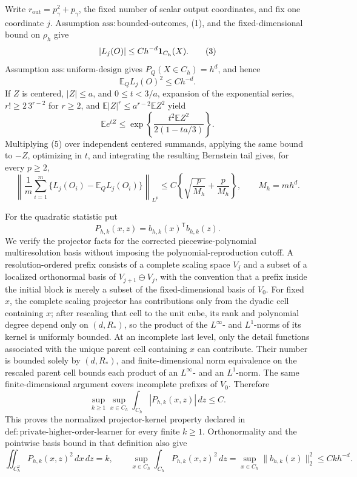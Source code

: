 Write \(r_{\mathrm{out}}=p_\gamma^2+p_\gamma\), the fixed number of scalar output coordinates, and fix one coordinate \(j\).  Assumption \(\mathrm{ass{:}bounded\text{-}outcomes}\), (1), and the fixed-dimensional bound on \(\rho_h\) give
\[
 |L_j(O)|\leq C h^{-d}{\bf1}_{C_h}(X).
\tag{3}
\]
Assumption \(\mathrm{ass{:}uniform\text{-}design}\) gives \(P_Q(X\in C_h)=h^d\), and hence
\[
 \mathbb E_Q L_j(O)^2\leq C h^{-d}.
\tag{4}
\]
If \(Z\) is centered, \(|Z|\le a\), and \(0\le t<3/a\), expansion of the exponential series, \(r!\ge2\,3^{r-2}\) for \(r\ge2\), and \(\mathbb E|Z|^r\le a^{r-2}\mathbb EZ^2\) yield
\[
 \mathbb E e^{tZ}
 \le\exp\!\left\{\frac{t^2\mathbb EZ^2}{2(1-ta/3)}\right\}.
\tag{5}
\]
Multiplying (5) over independent centered summands, applying the same bound to \(-Z\), optimizing in \(t\), and integrating the resulting Bernstein tail gives, for every \(p\ge2\),
\[
 \left\|\frac1m\sum_{i=1}^m
       \{L_j(O_i)-\mathbb E_Q L_j(O_i)\}\right\|_{L^p}
 \leq C\left\{\sqrt{\frac p{M_h}}+\frac p{M_h}\right\},
 \qquad M_h=mh^d.
\tag{6}
\]

For the quadratic statistic put
\[
 P_{h,k}(x,z)=b_{h,k}(x)^{\mathsf T}b_{h,k}(z).
\]
We verify the projector facts for the corrected piecewise-polynomial multiresolution basis without imposing the polynomial-reproduction cutoff.  A resolution-ordered prefix consists of a complete scaling space \(V_j\) and a subset of a localized orthonormal basis of \(V_{j+1}\ominus V_j\), with the convention that a prefix inside the initial block is merely a subset of the fixed-dimensional basis of \(V_0\).  For fixed \(x\), the complete scaling projector has contributions only from the dyadic cell containing \(x\); after rescaling that cell to the unit cube, its rank and polynomial degree depend only on \((d,R_*)\), so the product of the \(L^\infty\)- and \(L^1\)-norms of its kernel is uniformly bounded.  At an incomplete last level, only the detail functions associated with the unique parent cell containing \(x\) can contribute.  Their number is bounded solely by \((d,R_*)\), and finite-dimensional norm equivalence on the rescaled parent cell bounds each product of an \(L^\infty\)- and an \(L^1\)-norm.  The same finite-dimensional argument covers incomplete prefixes of \(V_0\).  Therefore
\[
 \sup_{k\ge1}\sup_{x\in C_h}
 \int_{C_h}|P_{h,k}(x,z)|\,dz\leq C.
\tag{7}
\]
This proves the normalized projector-kernel property declared in \(\mathrm{def{:}private\text{-}higher\text{-}order\text{-}learner}\) for every finite \(k\ge1\).  Orthonormality and the pointwise basis bound in that definition also give
\[
 \iint_{C_h^2}P_{h,k}(x,z)^2\,dx\,dz=k,
 \qquad
 \sup_{x\in C_h}\int_{C_h}P_{h,k}(x,z)^2\,dz
 =\sup_{x\in C_h}\|b_{h,k}(x)\|_2^2
 \leq Ckh^{-d}.
\tag{8}
\]

